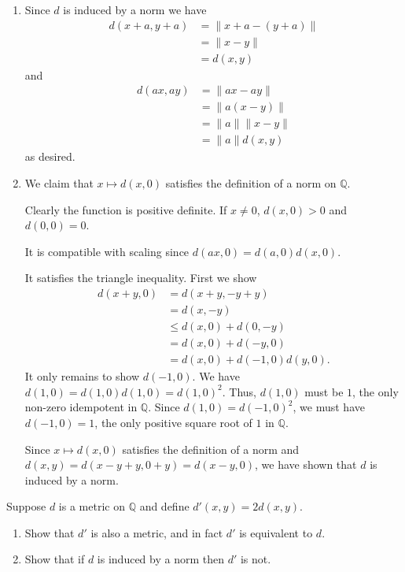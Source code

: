 \documentclass[12 pt, letterpaper]{hmcpset}
\begin{document}
\begin{solution}
	\begin{enumerate}
		\item Since $d$ is induced by a norm we have
			\begin{align*}
				d(x + a, y + a) & = \lVert x + a - (y + a) \rVert \\
						& = \lVert x - y \rVert \\
						& = d(x, y)
			\end{align*}
			and
			\begin{align*}
				d(ax, ay) & = \lVert ax - ay \rVert \\
					  & = \lVert a(x - y) \rVert \\
					  & = \lVert a \rVert \lVert x - y \rVert \\
					  & = \lVert a \rVert d(x, y)
			\end{align*}
			as desired.

		\item We claim that $x \mapsto d(x, 0)$ satisfies the definition of a norm on $\mathbb{Q}$.

			Clearly the function is positive definite. If $x \neq 0$, $d(x, 0) > 0$ and $d(0, 0) = 0$.

			It is compatible with scaling since $d(ax, 0) = d(a, 0) d(x, 0)$.

			It satisfies the triangle inequality. First we show
			\begin{align*}
				d(x + y, 0) & = d(x + y, -y + y) \\
					    & = d(x, -y) \\
					    & \le d(x, 0) + d(0, -y) \\
					    & = d(x, 0) + d(-y, 0) \\
					    & = d(x, 0) + d(-1, 0) d(y, 0).
			\end{align*}
			It only remains to show $d(-1, 0)$. We have $d(1, 0) = d(1, 0) d(1, 0) = d(1, 0)^{2}$. Thus, $d(1, 0)$ must be $1$, the only non-zero idempotent in $\mathbb{Q}$. Since $d(1, 0) = d(-1, 0)^{2}$, we must have $d(-1, 0) = 1$, the only positive square root of $1$ in $\mathbb{Q}$.

			Since $x \mapsto d(x, 0)$ satisfies the definition of a norm and $d(x, y) = d(x - y + y, 0 + y) = d(x - y, 0)$, we have shown that $d$ is induced by a norm.
	\end{enumerate}
\end{solution}

\pagebreak

\begin{problem}[(7)]
	Suppose $d$ is a metric on $\mathbb{Q}$ and define $d'(x, y) = 2 d(x, y)$.
	\begin{enumerate}
		\item Show that $d'$ is also a metric, and in fact $d'$ is equivalent to $d$.

		\item Show that if $d$ is induced by a norm then $d'$ is not.
	\end{enumerate}
\end{problem}
\end{document}
